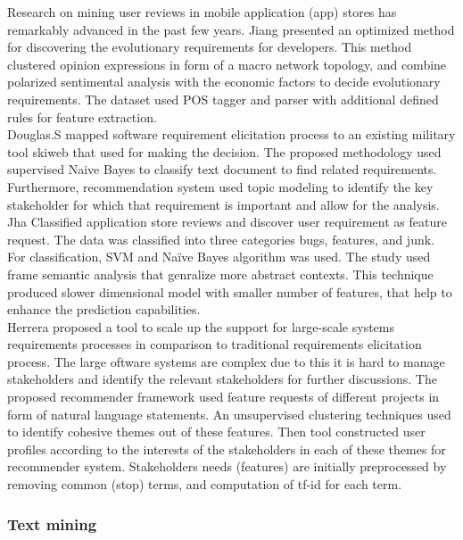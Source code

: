 Research on mining user reviews in mobile application (app) stores has
remarkably advanced in the past few years. Jiang \etal \cite{Jiang:2014}
presented an optimized method for discovering the evolutionary requirements for
developers. This method clustered opinion expressions in form of a macro network
topology, and combine polarized sentimental analysis with the economic factors
to decide evolutionary requirements. The dataset used POS tagger and parser with
additional defined rules for feature extraction.\\

 Douglas.S \etal\cite{Douglas:S2008} mapped software requirement elicitation process to an
existing military tool skiweb that used for making the decision. The proposed
methodology used supervised Naive Bayes to classify text document to find
related requirements. Furthermore, recommendation system used topic modeling to
identify the key stakeholder for which that requirement is important and allow
for the analysis.\\

 Jha \etal \cite{Jha:2017} Classified application store reviews
and discover user requirement as feature request. The data was classified into
three categories bugs, features, and junk. For classification, SVM and Naïve
Bayes algorithm was used. The study used frame semantic analysis that genralize
more abstract contexts. This technique produced slower dimensional model with
smaller number of features, that help to enhance the prediction
capabilities.\\

Herrera\etal \cite{Castro-Herrera:2009} proposed a tool to scale up
the support for large-scale systems requirements processes in comparison to
traditional requirements elicitation process. The large oftware systems are
complex due to this it is hard to manage stakeholders and identify the relevant
stakeholders for further discussions.
The proposed recommender framework used feature requests of different projects
in form of natural language statements.
An unsupervised clustering techniques used to identify cohesive themes out of
these features. Then tool constructed user profiles according to the interests
of the stakeholders in each of these themes for recommender system. Stakeholders
needs (features) are initially preprocessed by removing common (stop) terms, and
computation of tf-id for each term. \\



\subsubsection{Text mining}

